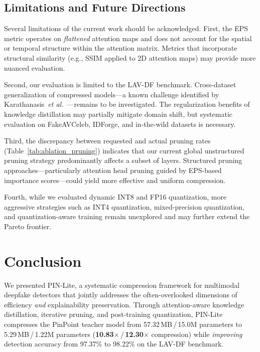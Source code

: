 \documentclass[lettersize,journal]{IEEEtran}
\begin{document}
\subsection{Limitations and Future Directions}

Several limitations of the current work should be acknowledged. First, the EPS metric operates on \emph{flattened} attention maps and does not account for the spatial or temporal structure within the attention matrix. Metrics that incorporate structural similarity (e.g., SSIM applied to 2D attention maps) may provide more nuanced evaluation.

Second, our evaluation is limited to the LAV-DF benchmark. Cross-dataset generalization of compressed models---a known challenge identified by Karathanasis~\textit{et al.}~\cite{karathanasis2025compression}---remains to be investigated. The regularization benefits of knowledge distillation may partially mitigate domain shift, but systematic evaluation on FakeAVCeleb, IDForge, and in-the-wild datasets is necessary.

Third, the discrepancy between requested and actual pruning rates (Table~\ref{tab:ablation_pruning}) indicates that our current global unstructured pruning strategy predominantly affects a subset of layers. Structured pruning approaches---particularly attention head pruning guided by EPS-based importance scores---could yield more effective and uniform compression.

Fourth, while we evaluated dynamic INT8 and FP16 quantization, more aggressive strategies such as INT4 quantization, mixed-precision quantization, and quantization-aware training remain unexplored and may further extend the Pareto frontier.


\section{Conclusion}
\label{sec:conclusion}

We presented PIN-Lite, a systematic compression framework for multimodal deepfake detectors that jointly addresses the often-overlooked dimensions of efficiency \emph{and} explainability preservation. Through attention-aware knowledge distillation, iterative pruning, and post-training quantization, PIN-Lite compresses the PinPoint teacher model from 57.32\,MB\,/\,15.0M parameters to 5.29\,MB\,/\,1.22M parameters (\textbf{10.83$\times$}\,/\,\textbf{12.30$\times$} compression) while \emph{improving} detection accuracy from 97.37\% to 98.22\% on the LAV-DF benchmark.
\end{document}
